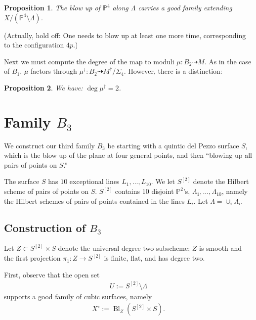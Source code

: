 \documentclass[12 pt]{amsart}
\newtheorem{proposition}{Proposition}[section]
\renewcommand{\P}{\mathbb{P}}
\newcommand{\<}{\left\langle}
\renewcommand{\>}{\right\rangle}
\DeclareMathOperator{\Bl}{Bl}
\begin{document}
\begin{proposition}
  \label{proposition:resolveB2} The blow up of $\P^{4}$ along
  $\Lambda$ carries a good family extending
  $X/(\P^{4} \setminus \Lambda)$.
\end{proposition}
(Actually, hold off: One needs to blow up at least one more time,
corresponding to the configuration $4p$.)



Next we must compute the degree of the map to moduli
$\mu: B_2 \dashrightarrow M$. As in the case of $B_1$, $\mu$ factors
through $\mu^{\dagger}: B_2 \dashrightarrow M^\dagger/\Sigma_{4}$.
However,  there is a distinction:

\begin{proposition}
  \label{proposition:deg-mudagger2}
  We have: $\deg \mu^{\dagger} = 2$.
\end{proposition}


\section{Family $B_3$}
\label{sec:family-b_3}

We construct our third family $B_3$ be starting with a quintic del
Pezzo surface $S$, which is the blow up of the plane at four general
points, and then ``blowing up all pairs of points on $S$.''

The surface $S$ has $10$ exceptional lines $L_{1}, \dots, L_{10}$.  We
let $S^{[2]}$ denote the Hilbert scheme of pairs of points on $S$.
$S^{[2]}$ contains $10$ disjoint $\P^{2}$'s,
$\Lambda_1, \dots, \Lambda_{10}$, namely the Hilbert schemes of pairs
of points contained in the lines $L_{i}$. Let
$\Lambda = \cup_{i}\Lambda_{i}$.

\subsection{Construction of $B_3$}
\label{sec:construction-b_3}

Let $Z \subset S^{[2]} \times S$ denote the universal degree two
subscheme; $Z$ is smooth and the first projection
$\pi_1 : Z \to S^{[2]}$ is finite, flat, and has degree two.



First, observe that the open set
\begin{align}
  \label{eq:UB3}
  U := S^{[2]} \setminus \Lambda
\end{align}
supports a good family of cubic surfaces, namely
\begin{align}
  \label{eq:XUB3}
  X^{\circ} := \Bl_{Z}(S^{[2]} \times S).
\end{align}
\end{document}
